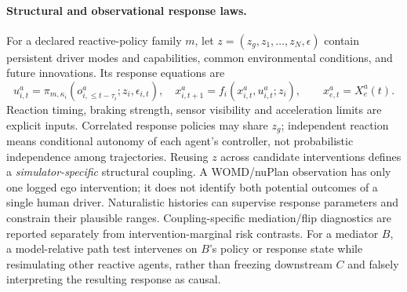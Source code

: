 \documentclass[10pt]{article}
\begin{document}
\paragraph{Structural and observational response laws.}
For a declared reactive-policy family $m$, let $z=(z_g,z_1,\ldots,z_N,\epsilon)$ contain persistent driver modes and capabilities, common environmental conditions, and future innovations. Its response equations are
\begin{equation}
 u^a_{i,t}=\pi_{m,\kappa_i}(o^a_{i,\le t-\tau_i};z_i,\epsilon_{i,t}),\quad
 x^a_{i,t+1}=f_i(x^a_{i,t},u^a_{i,t};z_i),\qquad x^a_{e,t}=X_e^a(t).
 \label{eq:scmapp}
\end{equation}
Reaction timing, braking strength, sensor visibility and acceleration limits are explicit inputs. Correlated response policies may share $z_g$; independent reaction means conditional autonomy of each agent's controller, not probabilistic independence among trajectories. Reusing $z$ across candidate interventions defines a \emph{simulator-specific} structural coupling. A WOMD/nuPlan observation has only one logged ego intervention; it does not identify both potential outcomes of a single human driver. Naturalistic histories can supervise response parameters and constrain their plausible ranges. Coupling-specific mediation/flip diagnostics are reported separately from intervention-marginal risk contrasts. For a mediator $B$, a model-relative path test intervenes on $B$'s policy or response state while resimulating other reactive agents, rather than freezing downstream $C$ and falsely interpreting the resulting response as causal.
\end{document}
